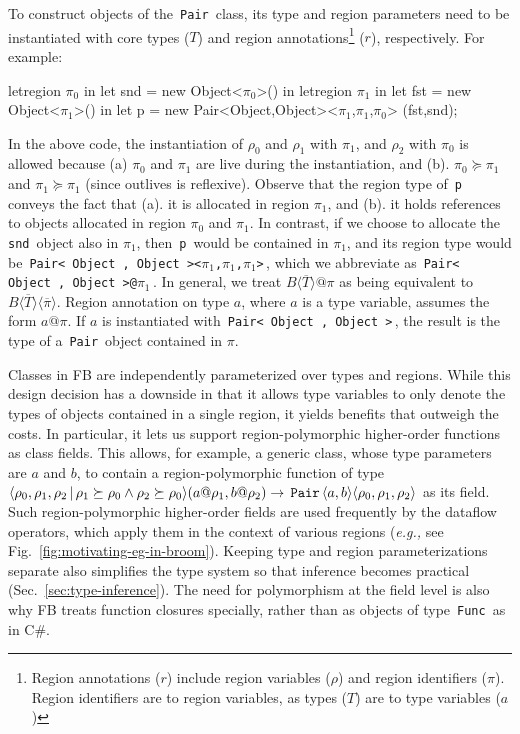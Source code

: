 \documentclass[a4paper,UKenglish]{lipics-v2018}
\newcommand{\C}[1]{\code{#1}}
\newcommand{\code}[1]{\,{\tt #1}\,}
\newcommand{\conj}{\wedge}
\newcommand{\FB}{{\sc FB}\xspace}
\newcommand{\outlives}{\succeq}
\newcommand{\ObjZ}{\C{Object}}
\newcommand{\inang}[1]{\langle #1 \rangle}
\newcommand{\rgn}{r}
\newcommand{\tbar}{\bar{T}}
\renewcommand{\bar}[1]{\overline{#1}}
\begin{document}
To construct objects of the \C{Pair} class, its type and region
parameters need to be instantiated with core types ($T$) and region
annotations\footnote{Region annotations ($\rgn$) include region
variables ($\rho$) and region identifiers ($\pi$). Region identifiers
are to region variables, as types ($T$) are to type variables ($a$)}
($\rgn$), respectively. For example:
\begin{codejava}

letregion $\pi_0$ in
  let snd = new Object<$\pi_0$>() in
  letregion $\pi_1$ in
    let fst = new Object<$\pi_1$>() in
    let p = new Pair<Object,Object><$\pi_1$,$\pi_1$,$\pi_0$> (fst,snd);
\end{codejava}
In the above code, the instantiation of $\rho_0$ and $\rho_1$ with
$\pi_1$, and $\rho_2$ with $\pi_0$ is allowed because (a) $\pi_0$ and
$\pi_1$ are live during the instantiation, and (b). $\pi_0 \outlives
\pi_1$ and $\pi_1 \outlives \pi_1$ (since outlives is reflexive).
Observe that the region type of \C{p} conveys the fact that (a). it is
allocated in region $\pi_1$, and (b). it holds references to objects
allocated in region $\pi_0$ and $\pi_1$.  In contrast, if we choose to
allocate the \C{snd} object also in $\pi_1$, then \C{p} would be
contained in $\pi_1$, and its region type would be
\C{Pair<\ObjZ,\ObjZ><$\pi_1$,$\pi_1$,$\pi_1$>}, which we abbreviate as
\C{Pair<\ObjZ,\ObjZ>@$\pi_1$}. In general, we treat
$B\inang{\tbar}@\pi$ as being equivalent to
$B\inang{\tbar}\inang{\bar{\pi}}$. Region annotation on type $a$,
where $a$ is a type variable, assumes the form $a@\pi$. If $a$ is
instantiated with \C{Pair<\ObjZ,\ObjZ>}, the result is the type of a
\C{Pair} object contained in  $\pi$.  

Classes in \FB are independently parameterized over types and regions.
While this design decision has a downside in that it allows type
variables to only denote the types of objects contained in a single
region, it yields benefits that outweigh the costs. In particular, it
lets us support region-polymorphic higher-order functions as class
fields.  This allows, for example, a generic class, whose type
parameters are $a$ and $b$, to contain a region-polymorphic function
of type $\inang{\rho_0,\rho_1,\rho_2 \,|\, \rho_1 \outlives \rho_0
\conj \rho_2 \outlives \rho_0}(a@\rho_1,b@\rho_2) \rightarrow
\C{Pair}\inang{a,b}\inang{\rho_0,\rho_1,\rho_2}$ as its field. Such
region-polymorphic higher-order fields are used frequently by the
dataflow operators, which apply them in the context of various regions
(\emph{e.g.,} see Fig.~\ref{fig:motivating-eg-in-broom}). Keeping type
and region parameterizations separate also simplifies the type system
so that inference becomes practical (Sec.~\ref{sec:type-inference}).
The need for polymorphism at the field level is also why \FB treats
function closures specially, rather than as objects of type \C{Func}
as in C\#.
\end{document}
